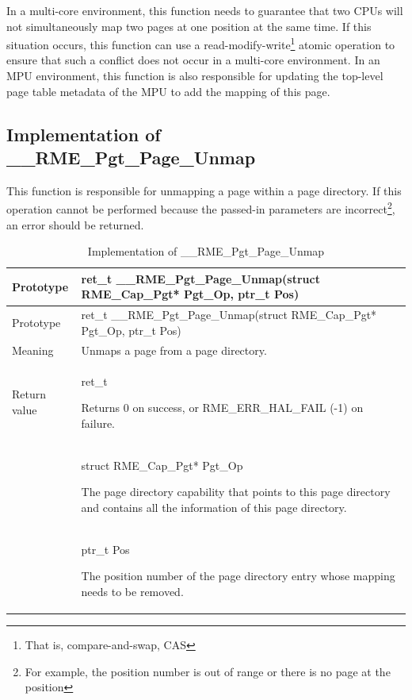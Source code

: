 In a multi-core environment, this function needs to guarantee that two CPUs will not simultaneously map two pages at one position at the same time. If this situation occurs, this function can use a read-modify-write\footnote{That is, compare-and-swap, CAS} atomic operation to ensure that such a conflict does not occur in a multi-core environment. In an MPU environment, this function is also responsible for updating the top-level page table metadata of the MPU to add the mapping of this page.

\subsection{Implementation of \_\_RME\_Pgt\_Page\_Unmap}\label{subsec:7-rme-pgt-page-unmap-implementation}

This function is responsible for unmapping a page within a page directory. If this operation cannot be performed because the passed-in parameters are incorrect\footnote{For example, the position number is out of range or there is no page at the position}, an error should be returned.

\begin{xltabular}{\textwidth}{@{}>{\hsize\raggedright\arraybackslash}X>{\hsize\raggedright\arraybackslash}X@{}}
\caption{Implementation of \_\_RME\_Pgt\_Page\_Unmap}\label{tab:7-80-rme-pgt-page-unmap-implementation}\\
\toprule
Prototype & ret\_t \_\_RME\_Pgt\_Page\_Unmap(struct RME\_Cap\_Pgt* Pgt\_Op,
ptr\_t Pos)\tabularnewline
\endfirsthead
\toprule
Prototype & ret\_t \_\_RME\_Pgt\_Page\_Unmap(struct RME\_Cap\_Pgt* Pgt\_Op,
ptr\_t Pos)\tabularnewline
\midrule
\endhead
\bottomrule
\endlastfoot
Meaning & Unmaps a page from a page directory.\tabularnewline
Return value\strut
 & ret\_t

Returns 0 on success, or RME\_ERR\_HAL\_FAIL (-1) on failure.\strut
\tabularnewline
{} & struct RME\_Cap\_Pgt* Pgt\_Op

The page directory capability that points to this page directory and contains all the information of this page directory.\strut
\tabularnewline
\strut
 & ptr\_t Pos

The position number of the page directory entry whose mapping needs to be removed.\strut
\tabularnewline
\end{xltabular}
\nopagebreak[4]

